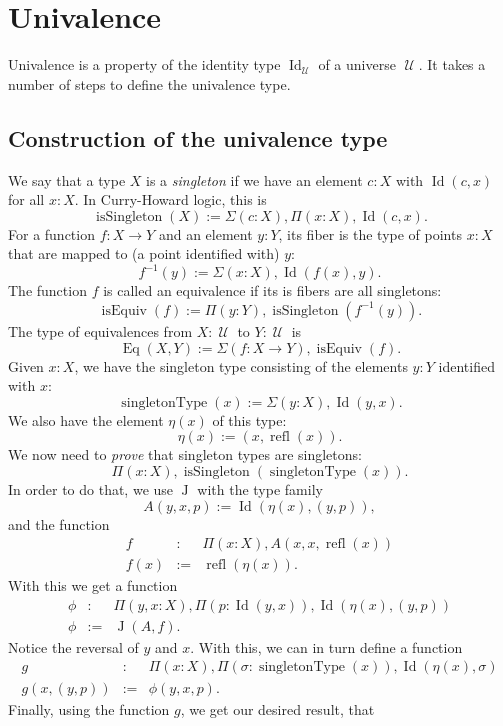 \documentclass{article}
\newcommand{\Id}{\operatorname{Id}}
\newcommand{\J}{\operatorname{J}}
\newcommand{\refl}{\operatorname{refl}}
\newcommand{\U}{\operatorname{\mathcal{U}}}
\newcommand{\isSingleton}{\operatorname{isSingleton}}
\newcommand{\isEquiv}{\operatorname{isEquiv}}
\newcommand{\Eq}{\operatorname{Eq}}
\newcommand{\singletonType}{\operatorname{singletonType}}
\begin{document}
\section{Univalence}

Univalence is a property of the identity type $\Id_{\U}$ of a universe $\U$. It
takes a number of steps to define the univalence type.

\subsection{Construction of the univalence type}

We say that a type $X$ is a \emph{singleton} if we have an element $c:X$ with
$\Id(c,x)$ for all $x:X$. In Curry-Howard logic, this is
\[
    \isSingleton(X) := \Sigma(c:X), \Pi(x:X), \Id(c,x).
\]
For a function $f:X\to Y$ and an element $y:Y$, its fiber is the type of
points $x:X$ that are mapped to (a point identified with) $y$:
\[
    f^{-1}(y) := \Sigma(x:X),\Id(f(x),y).
\]
The function $f$ is called an equivalence if its is fibers are all
singletons:
\[
    \isEquiv(f) := \Pi(y:Y), \isSingleton(f^{-1}(y)).
\]
The type of equivalences from $X:\U$ to $Y:\U$ is
\[
    \Eq(X,Y) := \Sigma(f:X\to Y), \isEquiv(f).
\]
Given $x:X$, we have the singleton type consisting of the elements $y:Y$
identified with $x$:
\[
   \singletonType(x) := \Sigma(y:X), \Id(y,x).
\]
We also have the element $\eta(x)$ of this type:
\[
   \eta(x) := (x, \refl(x)).
\]
We now need to \emph{prove} that singleton types are singletons:
\[
   \Pi(x:X), \isSingleton(\singletonType(x)).
\]
In order to do that, we use $\J$ with the type family
\[
   A(y,x,p) := \Id(\eta(x),(y,p)),
\]
and the function 
\begin{eqnarray*}
  f & : & \Pi(x:X), A(x,x,\refl(x)) \\
   f(x) & := & \refl(\eta(x)).
\end{eqnarray*}
With this we get a function
\begin{eqnarray*}
   \phi & : & \Pi(y,x:X), \Pi(p:\Id(y,x)), \Id(\eta(x),(y,p)) \\
   \phi & := & \J(A,f).
\end{eqnarray*}
Notice the reversal of $y$ and $x$.
%
With this, we can in turn define a function
\begin{eqnarray*}
   g & : & \Pi(x:X), \Pi(\sigma :\singletonType(x)), \Id(\eta(x),\sigma ) \\
   g(x,(y,p)) & := & \phi(y,x,p).
\end{eqnarray*}
Finally, using the function $g$, we get our desired result, that
\end{document}
